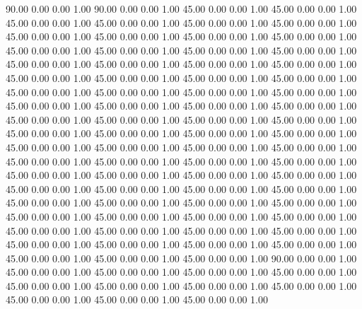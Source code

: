    90.00   0.00   0.00   1.00
   90.00   0.00   0.00   1.00
   45.00   0.00   0.00   1.00
   45.00   0.00   0.00   1.00
   45.00   0.00   0.00   1.00
   45.00   0.00   0.00   1.00
   45.00   0.00   0.00   1.00
   45.00   0.00   0.00   1.00
   45.00   0.00   0.00   1.00
   45.00   0.00   0.00   1.00
   45.00   0.00   0.00   1.00
   45.00   0.00   0.00   1.00
   45.00   0.00   0.00   1.00
   45.00   0.00   0.00   1.00
   45.00   0.00   0.00   1.00
   45.00   0.00   0.00   1.00
   45.00   0.00   0.00   1.00
   45.00   0.00   0.00   1.00
   45.00   0.00   0.00   1.00
   45.00   0.00   0.00   1.00
   45.00   0.00   0.00   1.00
   45.00   0.00   0.00   1.00
   45.00   0.00   0.00   1.00
   45.00   0.00   0.00   1.00
   45.00   0.00   0.00   1.00
   45.00   0.00   0.00   1.00
   45.00   0.00   0.00   1.00
   45.00   0.00   0.00   1.00
   45.00   0.00   0.00   1.00
   45.00   0.00   0.00   1.00
   45.00   0.00   0.00   1.00
   45.00   0.00   0.00   1.00
   45.00   0.00   0.00   1.00
   45.00   0.00   0.00   1.00
   45.00   0.00   0.00   1.00
   45.00   0.00   0.00   1.00
   45.00   0.00   0.00   1.00
   45.00   0.00   0.00   1.00
   45.00   0.00   0.00   1.00
   45.00   0.00   0.00   1.00
   45.00   0.00   0.00   1.00
   45.00   0.00   0.00   1.00
   45.00   0.00   0.00   1.00
   45.00   0.00   0.00   1.00
   45.00   0.00   0.00   1.00
   45.00   0.00   0.00   1.00
   45.00   0.00   0.00   1.00
   45.00   0.00   0.00   1.00
   45.00   0.00   0.00   1.00
   45.00   0.00   0.00   1.00
   45.00   0.00   0.00   1.00
   45.00   0.00   0.00   1.00
   45.00   0.00   0.00   1.00
   45.00   0.00   0.00   1.00
   45.00   0.00   0.00   1.00
   45.00   0.00   0.00   1.00
   45.00   0.00   0.00   1.00
   45.00   0.00   0.00   1.00
   45.00   0.00   0.00   1.00
   45.00   0.00   0.00   1.00
   45.00   0.00   0.00   1.00
   45.00   0.00   0.00   1.00
   45.00   0.00   0.00   1.00
   45.00   0.00   0.00   1.00
   45.00   0.00   0.00   1.00
   45.00   0.00   0.00   1.00
   45.00   0.00   0.00   1.00
   45.00   0.00   0.00   1.00
   45.00   0.00   0.00   1.00
   45.00   0.00   0.00   1.00
   45.00   0.00   0.00   1.00
   45.00   0.00   0.00   1.00
   45.00   0.00   0.00   1.00
   45.00   0.00   0.00   1.00
   45.00   0.00   0.00   1.00
   90.00   0.00   0.00   1.00
   45.00   0.00   0.00   1.00
   45.00   0.00   0.00   1.00
   45.00   0.00   0.00   1.00
   45.00   0.00   0.00   1.00
   45.00   0.00   0.00   1.00
   45.00   0.00   0.00   1.00
   45.00   0.00   0.00   1.00
   45.00   0.00   0.00   1.00
   45.00   0.00   0.00   1.00
   45.00   0.00   0.00   1.00
   45.00   0.00   0.00   1.00
